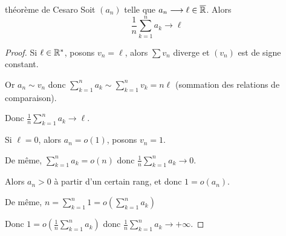 \begin{proposition}{théorème de Cesaro}{}
    Soit $(a_n)$ telle que $a_n \longrightarrow \ell \in \overline {\mathbb{R}}$. Alors 
    $$\frac 1 n \sum_{k = 1}^{n } a_k \longrightarrow \ell$$
    
\end{proposition}


\begin{proof}
    Si $\ell \in \mathbb{R}^*$, posons $v_n = \ell$, alors $\sum v_n$ diverge et $(v_n)$ est de signe constant.

    Or $\displaystyle a_n \sim v_n$ donc $\displaystyle \sum_{k = 1}^{n } a_k \sim \sum_{k = 1}^{n } v_k = n \ell$ (sommation des relations de comparaison). 

    Donc $\displaystyle \frac 1 n \sum_{k = 1}^{n } a_k \longrightarrow \ell$.

    \avspace Si $\ell = 0$, alors $a_n = o(1)$, posons $v_n = 1$.

    De même, $\displaystyle \sum_{k = 1}^{n } a_k = o(n)$ donc $\displaystyle \frac 1 n \sum_{k = 1}^{n } a_k \longrightarrow 0$.


    \svspace Alors $a_n > 0 $ à partir d'un certain rang, et donc $1 = o(a_n)$.

    De même, $\displaystyle n = \sum_{k = 1}^{n } 1 = o\left( \sum_{k = 1}^{n } a_k \right)$ 

    Donc $\displaystyle 1 = o\left( \frac 1 n \sum_{k = 1}^{n } a_k \right)$ donc $\displaystyle \frac 1 n \sum_{k = 1}^{n } a_k \longrightarrow + \infty$.
\end{proof}




